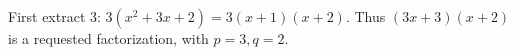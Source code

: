 First extract 3: $ 3(x^2+3x+2)=3(x+1)(x+2)$. Thus $\boxed{(3x+3)(x+2)}$ is a requested factorization, with $ p=3,q=2 $.
